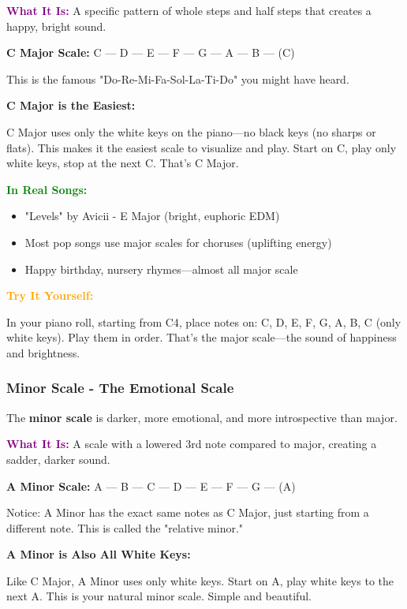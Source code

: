 \documentclass[11pt,letterpaper]{article}
\newcommand{\purple}[1]{\textcolor{purple}{\textbf{#1}}}
\newcommand{\greentext}[1]{\textcolor{green}{\textbf{#1}}}
\newcommand{\orangetext}[1]{\textcolor{orange}{\textbf{#1}}}
\begin{document}
\textbf{\purple{What It Is:}} A specific pattern of whole steps and half steps that creates a happy, bright sound.

\textbf{C Major Scale:} C — D — E — F — G — A — B — (C)

This is the famous "Do-Re-Mi-Fa-Sol-La-Ti-Do" you might have heard.

\begin{tcolorbox}[colback=lightgray,colframe=green,width=\textwidth,arc=3mm,boxrule=1pt]
\textbf{C Major is the Easiest:}

C Major uses only the white keys on the piano—no black keys (no sharps or flats). This makes it the easiest scale to visualize and play. Start on C, play only white keys, stop at the next C. That's C Major.
\end{tcolorbox}

\textbf{\greentext{In Real Songs:}}
\begin{itemize}[leftmargin=*]
\item "Levels" by Avicii - E Major (bright, euphoric EDM)
\item Most pop songs use major scales for choruses (uplifting energy)
\item Happy birthday, nursery rhymes—almost all major scale
\end{itemize}

\textbf{\orangetext{Try It Yourself:}}

In your piano roll, starting from C4, place notes on: C, D, E, F, G, A, B, C (only white keys). Play them in order. That's the major scale—the sound of happiness and brightness.

\subsubsection{Minor Scale - The Emotional Scale}

The \textbf{minor scale} is darker, more emotional, and more introspective than major.

\textbf{\purple{What It Is:}} A scale with a lowered 3rd note compared to major, creating a sadder, darker sound.

\textbf{A Minor Scale:} A — B — C — D — E — F — G — (A)

Notice: A Minor has the exact same notes as C Major, just starting from a different note. This is called the "relative minor."

\begin{tcolorbox}[colback=lightgray,colframe=blue,width=\textwidth,arc=3mm,boxrule=1pt]
\textbf{A Minor is Also All White Keys:}

Like C Major, A Minor uses only white keys. Start on A, play white keys to the next A. This is your natural minor scale. Simple and beautiful.
\end{tcolorbox}
\end{document}
